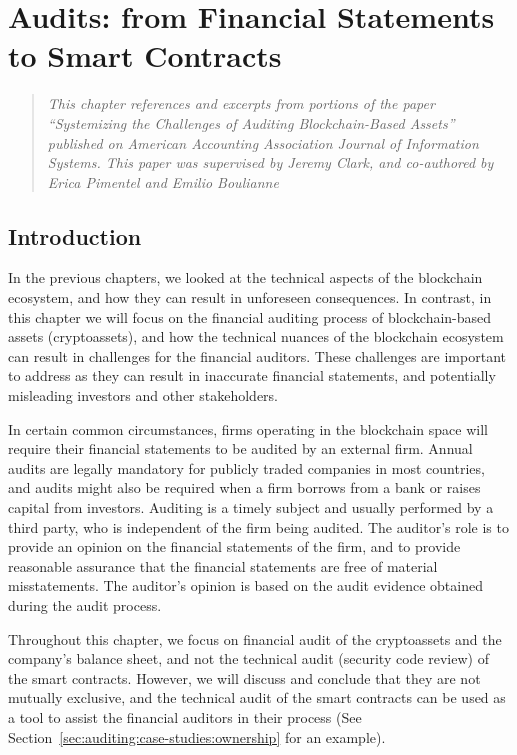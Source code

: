 \chapter{Audits: from Financial Statements to Smart Contracts} \label{sec:auditing}


\begin{quote}
	\textit{This chapter references and excerpts from portions of the paper ``Systemizing the Challenges of Auditing Blockchain-Based Assets''~\cite{pimentel2021systemizing} published on American Accounting Association Journal of Information Systems. This paper was supervised by Jeremy Clark, and co-authored by Erica Pimentel and Emilio Boulianne}
\end{quote}



\section{Introduction} \label{sec:auditing:intro}

In the previous chapters, we looked at the technical aspects of the blockchain ecosystem, and how they can result in unforeseen consequences. In contrast, in this chapter we will focus on the financial auditing process of blockchain-based assets (cryptoassets), and how the technical nuances of the blockchain ecosystem can result in challenges for the financial auditors. These challenges are important to address as they can result in inaccurate financial statements, and potentially misleading investors and other stakeholders.

In certain common circumstances, firms operating in the blockchain space will require their financial statements to be audited by an external firm. Annual audits are legally mandatory for publicly traded companies in most countries, and audits might also be required when a firm borrows from a bank or raises capital from investors. Auditing is a timely subject and usually performed by a third party, who is independent of the firm being audited. The auditor's role is to provide an opinion on the financial statements of the firm, and to provide reasonable assurance that the financial statements are free of material misstatements. The auditor's opinion is based on the audit evidence obtained during the audit process. 

Throughout this chapter, we focus on financial audit of the cryptoassets and the company's balance sheet, and not the technical audit (\eg security code review) of the smart contracts. However, we will discuss and conclude that they are not mutually exclusive, and the technical audit of the smart contracts can be used as a tool to assist the financial auditors in their process (See Section~\ref{sec:auditing:case-studies:ownership} for an example).


